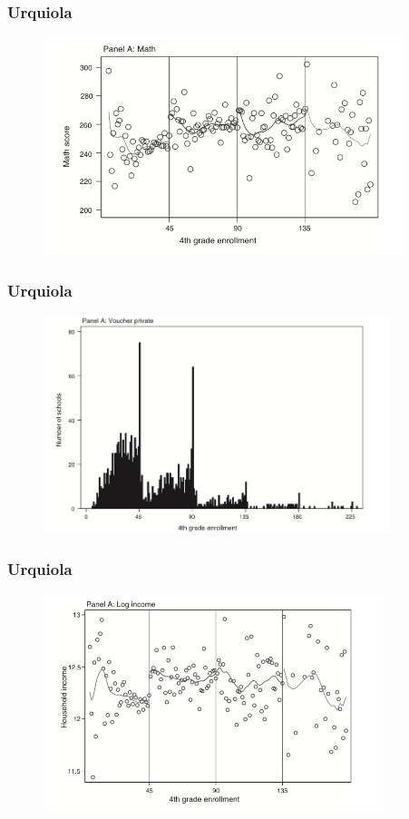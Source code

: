 \documentclass{beamer}
\begin{document}
\begin{frame}[t]\frametitle{Urquiola}
	\begin{figure}[htbp]
		\centering
			\includegraphics[height=2.5in]{Urquiola1.png}
		\label{fig:Urquiola1}
	\end{figure}
\end{frame}

\begin{frame}[t]\frametitle{Urquiola}
	\begin{figure}[htbp]
		\centering
			\includegraphics[height=2.5in]{Urquiola2.png}
	\end{figure}
\end{frame}

\begin{frame}[t]\frametitle{Urquiola}
	\begin{figure}[htbp]
		\centering
			\includegraphics[height=2.5in]{Urquiola3.png}
	\end{figure}
\end{frame}
\end{document}
